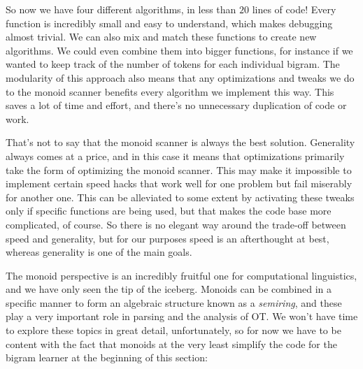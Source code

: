 So now we have four different algorithms, in less than $20$ lines of code!
Every function is incredibly small and easy to understand, which makes debugging almost trivial.
We can also mix and match these functions to create new algorithms.
We could even combine them into bigger functions, for instance if we wanted to keep track of the number of tokens for each individual bigram.
The modularity of this approach also means that any optimizations and tweaks we do to the monoid scanner benefits every algorithm we implement this way.
This saves a lot of time and effort, and there's no unnecessary duplication of code or work.

That's not to say that the monoid scanner is always the best solution.
Generality always comes at a price, and in this case it means that optimizations primarily take the form of optimizing the monoid scanner.
This may make it impossible to implement certain speed hacks that work well for one problem but fail miserably for another one.
This can be alleviated to some extent by activating these tweaks only if specific functions are being used, but that makes the code base more complicated, of course.
So there is no elegant way around the trade-off between speed and generality, but for our purposes speed is an afterthought at best, whereas generality is one of the main goals.

The monoid perspective is an incredibly fruitful one for computational linguistics, and we have only seen the tip of the iceberg.
Monoids can be combined in a specific manner to form an algebraic structure known as a \emph{semiring}, and these play a very important role in parsing and the analysis of OT\@.
We won't have time to explore these topics in great detail, unfortunately, so for now we have to be content with the fact that monoids at the very least simplify the code for the bigram learner at the beginning of this section:
%
\begin{center}
\end{center}
